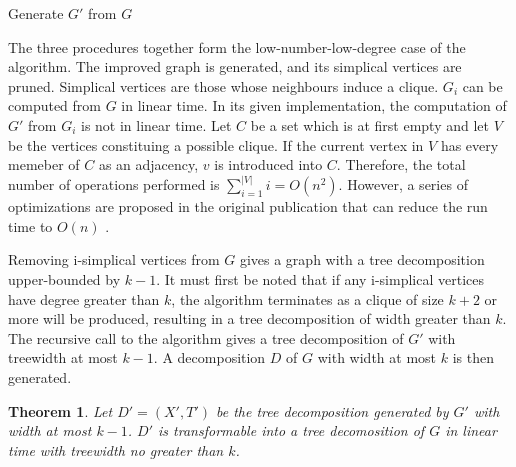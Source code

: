 \documentclass[12pt,conference]{IEEEtran}
\theoremstyle{plain}
\newtheorem{theorem}{Theorem}
\begin{document}
\begin{algorithm}
  \caption{Generate $G'$ from $G$}
  \label{improved_graph_generate}
  \begin{algorithmic}[1]
    \EndIf
  \EndFor
  \EndFor
  \EndProcedure
\State{}
      \EndIf
  \EndFor
  \EndProcedure
\State{}

      \EndIf
    \EndFor
  \EndFor
  \EndProcedure
  \end{algorithmic}
\end{algorithm}

The three procedures together form the low-number-low-degree case of the algorithm. The improved graph is generated, and its simplical vertices are pruned. Simplical vertices are those whose neighbours induce a clique. $G_{i}$ can be computed from $G$ in linear time. In its given implementation, the computation of $G'$ from $G_{i}$ is not in linear time. Let $C$ be a set which is at first empty and let $V$ be the vertices constituing a possible clique. If the current vertex in $V$ has every memeber of $C$ as an adjacency, $v$ is introduced into $C$. Therefore, the total number of operations performed is $\sum_{i=1}^{|V|}i=O(n^{2})$. However, a series of optimizations are proposed in the original publication that can reduce the run time to $O(n)$ \cite{bodlaender-1992}.

Removing i-simplical vertices from $G$ gives a graph with a tree decomposition upper-bounded by $k-1$. It must first be noted that if any i-simplical vertices have degree greater than $k$, the algorithm terminates as a clique of size $k+2$ or more will be produced, resulting in a tree decomposition of width greater than $k$. The recursive call to the algorithm gives a tree decomposition of $G'$ with treewidth at most $k-1$. A decomposition $D$ of $G$ with width at most $k$ is then generated.

\begin{theorem}
Let $D' = (X',T')$ be the tree decomposition generated by $G'$ with width at most $k-1$. $D'$ is transformable into a tree decomosition of $G$ in linear time with treewidth no greater than $k$.
\end{theorem}
\end{document}
